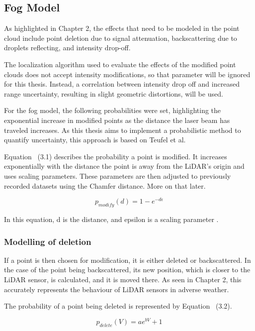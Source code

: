 \subsection{Fog Model}
As highlighted in Chapter 2, the effects that need to be modeled in the point cloud include point deletion due to signal attenuation, backscattering due to droplets reflecting, and intensity drop-off. 

The localization algorithm used to evaluate the effects of the modified point clouds does not accept intensity modifications, so that parameter will be ignored for this thesis. Instead, a correlation between intensity drop off and increased range uncertainty, resulting in slight geometric distortions, will be used. 

For the fog model, the following probabilities were set, highlighting the exponential increase in modified points as the distance the laser beam has traveled increases. %
As this thesis aims to implement a probabilistic method to quantify uncertainty, this approach is based on Teufel et al.

Equation ~(3.1) describes the probability a point is modified. It increases exponentially with the distance the point is away from the LiDAR's origin and uses scaling parameters. These parameters are then adjusted to previously recorded datasets using the Chamfer distance. More on that later. 

\begin{equation}
    p_{modify}(d) = 1- e^{-d\epsilon} 
\end{equation}

In this equation, d is the distance, and epsilon is a scaling parameter \cite{teufel_simulating_2022}. 

\subsubsection{Modelling of deletion}
If a point is then chosen for modification, it is either deleted or backscattered. In the case of the point being backscattered, its new position, which is closer to the LiDAR sensor, is calculated, and it is moved there. As seen in Chapter 2, this accurately represents the behaviour of LiDAR sensors in adverse weather. 

The probability of a point being deleted is represented by Equation ~(3.2).

\begin{equation}
    p_{delete}(V)=ae^{bV} + 1 
\end{equation}


